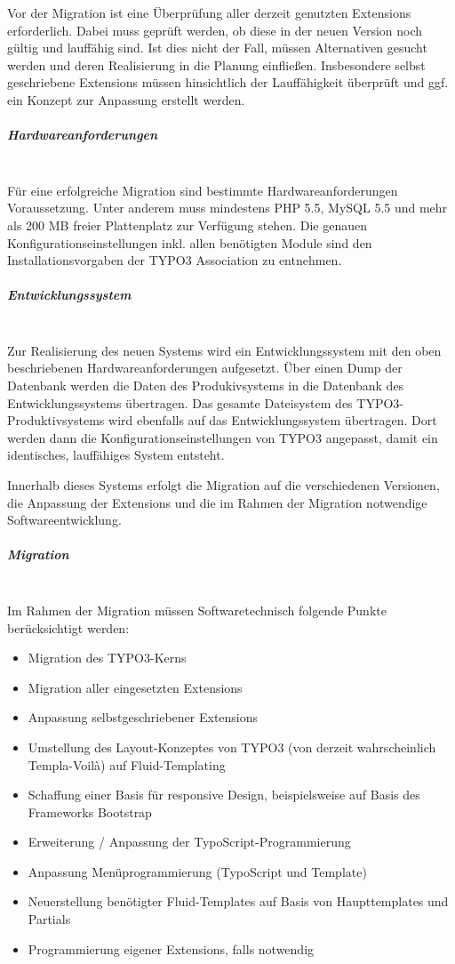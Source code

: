 Vor der Migration ist eine Überprüfung aller derzeit genutzten Extensions erforderlich. Dabei muss geprüft werden, ob diese in der neuen Version noch gültig und lauffähig sind. Ist dies nicht der Fall, müssen Alternativen gesucht werden und deren Realisierung in die Planung einfließen. Insbesondere selbst geschriebene Extensions müssen hinsichtlich der Lauffähigkeit überprüft und ggf. ein Konzept zur Anpassung erstellt werden.

\subparagraph{Hardwareanforderungen}\mbox{}\\
Für eine erfolgreiche Migration sind bestimmte Hardwareanforderungen Voraussetzung. Unter anderem muss mindestens PHP 5.5, MySQL 5.5 und mehr als 200 MB freier Plattenplatz zur Verfügung stehen. Die genauen Konfigurationseinstellungen inkl. allen benötigten Module sind den Installationsvorgaben\cite{typo3_install_2015} der TYPO3 Association zu entnehmen.

\subparagraph{Entwicklungssystem}\mbox{}\\
Zur Realisierung des neuen Systems wird ein Entwicklungssystem mit den oben beschriebenen Hardwareanforderungen aufgesetzt. Über einen Dump der Datenbank werden die Daten des Produkivsystems in die Datenbank des Entwicklungssystems übertragen. Das gesamte Dateisystem des TYPO3-Produktivsystems wird ebenfalls auf das Entwicklungssystem übertragen. Dort werden dann die Konfigurationseinstellungen von TYPO3 angepasst, damit ein identisches, lauffähiges System entsteht.

Innerhalb dieses Systems erfolgt die Migration auf die verschiedenen Versionen, die Anpassung der Extensions und die im Rahmen der Migration notwendige Softwareentwicklung.

\subparagraph{Migration}\mbox{}\\
Im Rahmen der Migration müssen Softwaretechnisch folgende Punkte berücksichtigt werden:
\begin{itemize}
\item Migration des TYPO3-Kerns
\item Migration aller eingesetzten Extensions
\item Anpassung selbstgeschriebener Extensions
\item Umstellung des Layout-Konzeptes von TYPO3 (von derzeit wahrscheinlich Templa-Voilà) auf Fluid-Templating
\item Schaffung einer Basis für responsive Design, beispielsweise auf Basis des Frameworks Bootstrap
\item Erweiterung / Anpassung der TypoScript-Programmierung
\item Anpassung Menüprogrammierung (TypoScript und Template)
\item Neuerstellung benötigter Fluid-Templates auf Basis von Haupttemplates und Partials
\item Programmierung eigener Extensions, falls notwendig
\end{itemize}

